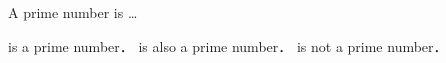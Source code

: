 \begin{definition}
  A prime number is \dots 
\end{definition}

\begin{example}   
  \begin{itemize}
     is a prime number．
     is also a prime number．
     is not a prime number．
  \end{itemize}
\end{example}
